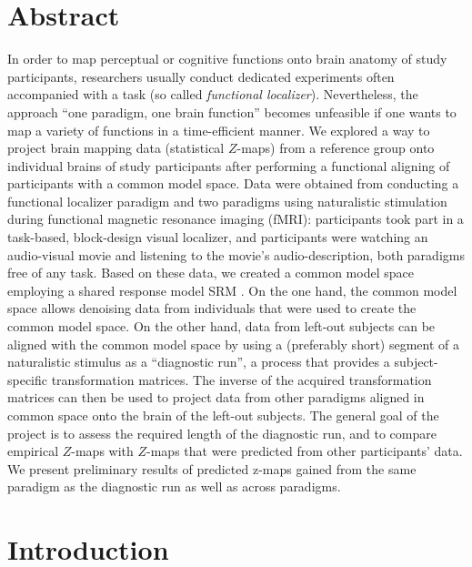 \section{Abstract}
In order to map perceptual or cognitive functions onto brain anatomy of study
participants, researchers usually conduct dedicated experiments often
accompanied with a task (so called \textit{functional localizer}).
Nevertheless, the approach ``one paradigm, one brain function'' becomes
unfeasible if one wants to map a variety of functions in a time-efficient
manner.
We explored a way to project brain mapping data (statistical $Z$-maps) from a
reference group onto individual brains of study participants after performing a
functional aligning of participants with a common model space.
%
Data were obtained from conducting a functional localizer paradigm and two
paradigms using naturalistic stimulation during functional magnetic resonance
imaging (fMRI):
%
participants took part in a task-based, block-design visual localizer, and
participants were watching an audio-visual movie and listening to the movie's
audio-description, both paradigms free of any task.
%
Based on these data, we created a common model space employing a shared response
model {SRM} \citep{chen2015reduced}.
%
On the one hand, the common model space allows denoising data from individuals
that were used to create the common model space.
%
On the other hand, data from left-out subjects can be aligned with the common
model space by using a (preferably short) segment of a naturalistic stimulus as
a ``diagnostic run'', a process that provides a subject-specific transformation
matrices.
%
The inverse of the acquired transformation matrices can then be used to project
data from other paradigms aligned in common space onto the brain of the left-out
subjects.
%
The general goal of the project is to assess the required length of the
diagnostic run, and to compare empirical $Z$-maps with $Z$-maps that were
predicted from other participants' data.
%
We present preliminary results of predicted z-maps gained from the same paradigm
as the diagnostic run as well as across paradigms.


\section{Introduction}


